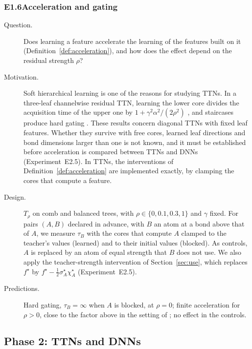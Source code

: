 \documentclass[11pt]{article}
\theoremstyle{definition}
\numberwithin{equation}{section}
\begin{document}
\subsubsection*{E1.6\quad Acceleration and gating}
\begin{description}
\item[Question.] Does learning a feature accelerate the learning of the features built on it (Definition~\ref{def:acceleration}), and how does the effect depend on the residual strength $\rho$?
\item[Motivation.] Soft hierarchical learning is one of the reasons for studying TTNs. In a three-leaf channelwise residual TTN, learning the lower core divides the acquisition time of the upper one by $1+\gamma^2\alpha^2/(2\rho^2)$ \citep[Proposition~6.1]{hfl_diagonal}, and staircases produce hard gating \citep[Section~5]{hfl_diagonal}. These results concern diagonal TTNs with fixed leaf features. Whether they survive with free cores, learned leaf directions and bond dimensions larger than one is not known, and it must be established before acceleration is compared between TTNs and DNNs (Experiment~E2.5). In TTNs, the interventions of Definition~\ref{def:acceleration} are implemented exactly, by clamping the cores that compute a feature.
\item[Design.] $T_\rho$ on comb and balanced trees, with $\rho\in\{0,0.1,0.3,1\}$ and $\gamma$ fixed. For pairs $(A,B)$ declared in advance, with $B$ an atom at a bond above that of $A$, we measure $\tau_B$ with the cores that compute $A$ clamped to the teacher's values (learned) and to their initial values (blocked). As controls, $A$ is replaced by an atom of equal strength that $B$ does not use. We also apply the teacher-strength intervention of Section~\ref{sec:use}, which replaces $f^\star$ by $f^\star-\tfrac12\sigma^\star_A\chi^\star_A$ (Experiment~E2.5).
\item[Predictions.] Hard gating, $\tau_B=\infty$ when $A$ is blocked, at $\rho=0$; finite acceleration for $\rho>0$, close to the factor above in the setting of \citet[Proposition~6.1]{hfl_diagonal}; no effect in the controls.
\end{description}

\subsection{Phase 2: TTNs and DNNs}\label{sec:exp-phase2}
\end{document}
